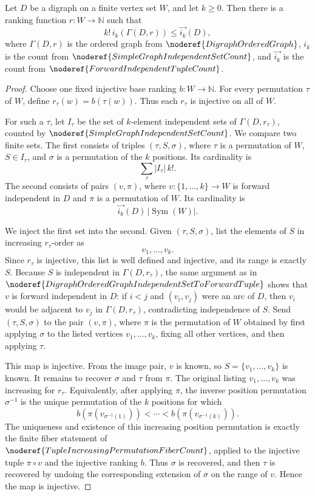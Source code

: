 \begin{helper}
Let \(D\) be a digraph on a finite vertex set \(W\), and let \(k\ge 0\). Then there is a ranking function \(r:W\to\mathbb N\) such that
\[
  k!\, i_k(\Gamma(D,r))\le \overrightarrow{i_k}(D),
\]
where \(\Gamma(D,r)\) is the ordered graph from \(\noderef{DigraphOrderedGraph}\), \(i_k\) is the count from \(\noderef{SimpleGraphIndependentSetCount}\), and \(\overrightarrow{i_k}\) is the count from \(\noderef{ForwardIndependentTupleCount}\).
\end{helper}
\begin{proof}
Choose one fixed injective base ranking \(b:W\to\mathbb N\). For every permutation \(\tau\) of \(W\), define \(r_\tau(w)=b(\tau(w))\). Thus each \(r_\tau\) is injective on all of \(W\).

For such a \(\tau\), let \(I_\tau\) be the set of \(k\)-element independent sets of \(\Gamma(D,r_\tau)\), counted by \(\noderef{SimpleGraphIndependentSetCount}\). We compare two finite sets. The first consists of triples \((\tau,S,\sigma)\), where \(\tau\) is a permutation of \(W\), \(S\in I_\tau\), and \(\sigma\) is a permutation of the \(k\) positions. Its cardinality is
\[
  \sum_\tau |I_\tau|\,k!.
\]
The second consists of pairs \((v,\pi)\), where \(v:\{1,\ldots,k\}\to W\) is forward independent in \(D\) and \(\pi\) is a permutation of \(W\). Its cardinality is
\[
  \overrightarrow{i_k}(D)\,|\operatorname{Sym}(W)|.
\]

We inject the first set into the second. Given \((\tau,S,\sigma)\), list the elements of \(S\) in increasing \(r_\tau\)-order as
\[
  v_1,\ldots,v_k .
\]
Since \(r_\tau\) is injective, this list is well defined and injective, and its range is exactly \(S\). Because \(S\) is independent in \(\Gamma(D,r_\tau)\), the same argument as in \(\noderef{DigraphOrderedGraphIndependentSetToForwardTuple}\) shows that \(v\) is forward independent in \(D\): if \(i<j\) and \((v_i,v_j)\) were an arc of \(D\), then \(v_i\) would be adjacent to \(v_j\) in \(\Gamma(D,r_\tau)\), contradicting independence of \(S\). Send \((\tau,S,\sigma)\) to the pair \((v,\pi)\), where \(\pi\) is the permutation of \(W\) obtained by first applying \(\sigma\) to the listed vertices \(v_1,\ldots,v_k\), fixing all other vertices, and then applying \(\tau\).

This map is injective. From the image pair, \(v\) is known, so \(S=\{v_1,\ldots,v_k\}\) is known. It remains to recover \(\sigma\) and \(\tau\) from \(\pi\). The original listing \(v_1,\ldots,v_k\) was increasing for \(r_\tau\). Equivalently, after applying \(\pi\), the inverse position permutation \(\sigma^{-1}\) is the unique permutation of the \(k\) positions for which
\[
  b(\pi(v_{\sigma^{-1}(1)}))<\cdots<b(\pi(v_{\sigma^{-1}(k)})).
\]
The uniqueness and existence of this increasing position permutation is exactly the finite fiber statement of \(\noderef{TupleIncreasingPermutationFiberCount}\), applied to the injective tuple \(\pi\circ v\) and the injective ranking \(b\). Thus \(\sigma\) is recovered, and then \(\tau\) is recovered by undoing the corresponding extension of \(\sigma\) on the range of \(v\). Hence the map is injective.


\end{proof}
